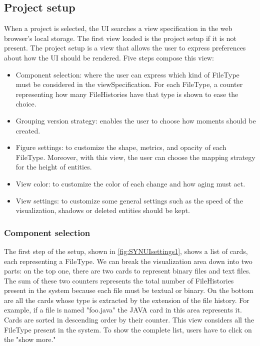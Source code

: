 \subsection*{Project setup}
When a project is selected, the UI searches a view specification in the web browser's local storage. 
The first view loaded is the project setup if it is not present.
The project setup is a view that allows the user to express preferences about how the UI should be rendered. 
Five steps compose this view:
\begin{itemize}
    \item Component selection: where the user can express which kind of FileType must be considered in the viewSpecification. 
    For each FileType, a counter representing how many FileHistories have that type is shown to ease the choice. 
    \item Grouping version strategy: enables the user to choose how moments should be created.
    \item Figure settings: to customize the shape, metrics, and opacity of each FileType. Moreover, with this view, the user can choose the mapping strategy for the height of entities. 
    \item View color: to customize the color of each change and how aging must act. 
    \item View settings: to customize some general settings such as the speed of the visualization, shadows or deleted entities should be kept. 
\end{itemize}

\subsubsection*{Component selection}
The first step of the setup, shown in \autoref{fig:SYNUIsettings1}, shows a list of cards, each representing a FileType. 
We can break the visualization area down into two parts: on the top one, there are two cards to represent binary files and text files. 
The sum of these two counters represents the total number of FileHistories present in the system because each file must be textual or binary. 
On the bottom are all the cards whose type is extracted by the extension of the file history. For example, if a file is named "foo.java" the JAVA card in this area represents it. 
Cards are sorted in descending order by their counter. This view considers all the FileType present in the system. To show the complete list, users have to click on the "show more."


